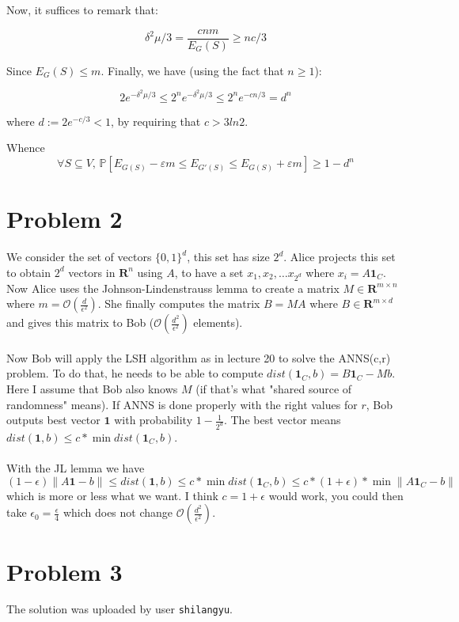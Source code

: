 \documentclass[a4paper, 11pt]{article}
\begin{document}
Now, it suffices to remark that:

$$\delta^2\mu/3 = \frac{cnm}{E_G(S)} \ge nc/3$$

Since $E_G(S) \le m$. Finally, we have (using the fact that $n \ge 1$):

$$2e^{-\delta^2\mu/3} \le 2^n e^{-\delta^2\mu/3} \le 2^n e^{-cn/3} = d^n $$

where $d := 2e^{- c/3} < 1$, by requiring that $c > 3ln2$.

Whence $$\boxed{\forall S \subseteq V,\, \mathbb{P}\left[E_{G(S)} - \varepsilon m \le E_{G'(S)} \le E_{G(S)} + \varepsilon m\right] \ge 1-d^n}$$

\newpage

\section*{Problem 2}

We consider the set of vectors $\{ 0,1\} ^d$, this set has size $2^d$. Alice projects this set to obtain $2^d$ vectors in $\mathbf{R}^n$ using $A$, to have a set $x_1,x_2,\dots x_{2^d}$ where $x_i=A\mathbf{1}_C$. Now Alice uses the Johnson-Lindenstrauss lemma to create a matrix $M\in \mathbf{R}^{m\times n}$ where $m=\mathcal{O}\left(\frac{d}{\epsilon^2}\right)$. She finally computes the matrix $B=MA$ where $B\in \mathbf{R}^{m\times d}$ and gives this matrix to Bob ($\mathcal{O}\left(\frac{d^2}{\epsilon^2}\right)$ elements).
\\\\
Now Bob will apply the LSH algorithm as in lecture 20 to solve the ANNS(c,r) problem. To do that, he needs to be able to compute $dist(\mathbf{1}_C,b) = B\mathbf{1}_C-Mb$. Here I assume that Bob also knows $M$ (if that's what "shared source of randomness" means). If ANNS is done properly with the right values for $r$, Bob outputs best vector $\mathbf{1}$ with probability $1-\frac{1}{2^d}$. The best vector means $dist(\mathbf{1},b)\leq c*\min dist(\mathbf{1}_C,b)$.
\\\\
With the JL lemma we have $$(1-\epsilon)\|A\mathbf{1}-b\|\leq dist(\mathbf{1},b)\leq c*\min dist(\mathbf{1}_C,b)\leq c*(1+\epsilon)*\min \|A\mathbf{1}_C-b\|$$ which is more or less what we want. I think $c=1+\epsilon$ would work, you could then take $\epsilon_0=\frac{\epsilon}{4}$ which does not change $\mathcal{O}\left(\frac{d^2}{\epsilon^2}\right)$.

\newpage

\section*{Problem 3}

The solution was uploaded by user \texttt{shilangyu}.
\end{document}

